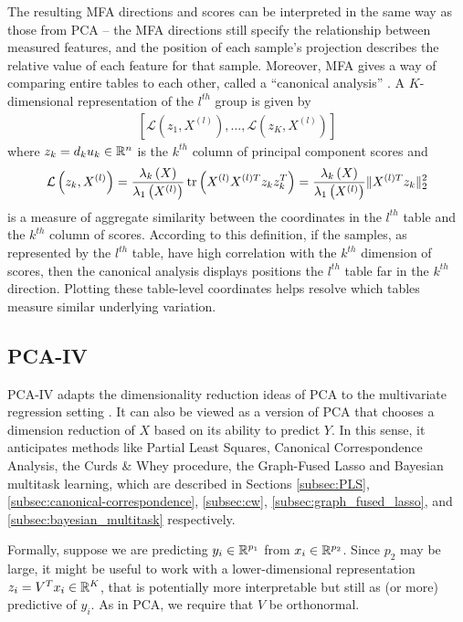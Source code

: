 \documentclass[utf8]{frontiersFPHY} %
\begin{document}
The resulting MFA directions and scores can be interpreted in the same way as
those from PCA -- the MFA directions still specify the relationship between
measured features, and the position of each sample's projection describes the
relative value of each feature for that sample. Moreover, MFA gives a way of
comparing entire tables to each other, called a ``canonical analysis''
\citep{pages2004multiple}. A $K$-dimensional representation of the $l^{th}$
group is given by
\begin{align*}
\left[\mathcal{L}\left(z_{1}, X^{(l)}\right), \dots, \mathcal{L}\left(z_{K},
  X^{(l)}\right)\right]
\end{align*}
where $z_{k} = d_{k}u_{k} \in \mathbb{R}^{n}$ is the $k^{th}$ column of principal
component scores and
\begin{align*}
  \mathcal{L}\left(z_{k}, X^{(l)}\right) =
  \frac{\lambda_{k}\left(X\right)}{\lambda_{1}\left(X^{(l)}\right)}\mathop\mathrm{tr}\left(X^{(l)}X^{(l)
    T} z_{k}z_{k}^{T}\right) =
  \frac{\lambda_{k}\left(X\right)}{\lambda_{1}\left(X^{(l)}\right)}\|X^{(l) T}
  z_{k}\|^{2}_{2}
\end{align*}
is a measure of aggregate similarity between the coordinates in the $l^{th}$
table and the $k^{th}$ column of scores. According to this definition, if the
samples, as represented by the $l^{th}$ table, have high correlation with the
$k^{th}$ dimension of scores, then the canonical analysis displays positions the
$l^{th}$ table far in the $k^{th}$ direction. Plotting these table-level
coordinates helps resolve which tables measure similar underlying variation.

\subsection{PCA-IV}
\label{subsec:pcaiv}

PCA-IV adapts the dimensionality reduction ideas of PCA to the multivariate
regression setting \citep{rao1964use}. It can also be viewed as a version of PCA
that chooses a dimension reduction of $X$ based on its ability to predict $Y$.
In this sense, it anticipates methods like Partial Least Squares, Canonical
Correspondence Analysis, the Curds \& Whey procedure, the Graph-Fused Lasso and
Bayesian multitask learning, which are described in Sections \ref{subsec:PLS},
\ref{subsec:canonical-correspondence}, \ref{subsec:cw},
\ref{subsec:graph_fused_lasso}, and \ref{subsec:bayesian_multitask}
respectively.

Formally, suppose we are predicting $y_{i} \in \mathbb{R}^{p_{1}}$ from $x_{i} \in
\mathbb{R}^{p_{2}}$. Since $p_{2}$ may be large, it might be useful to work with a
lower-dimensional representation $z_{i} = V^{T}x_{i} \in \mathbb{R}^{K}$, that is
potentially more interpretable but still as (or more) predictive of $y_{i}$. As
in PCA, we require that $V$ be orthonormal.
\end{document}
